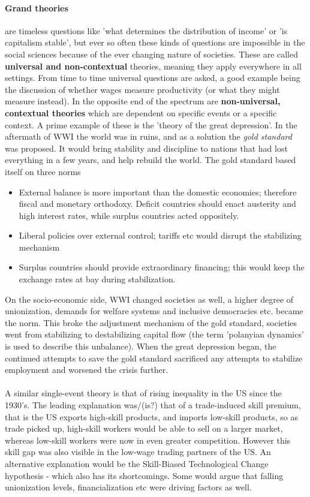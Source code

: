 \documentclass[12pt, a4paper]{article}
\begin{document}
\begin{multicols}{2}
\paragraph{Grand theories} are timeless questions like 'what determines the distribution of income' or 'is capitalism stable', but ever so often these kinds of questions are impossible in the social sciences because of the ever changing nature of societies. These are called \textbf{universal and non-contextual} theories, meaning they apply everywhere in all settings. From time to time universal questions are asked, a good example being the discussion of whether wages measure productivity (or what they might measure instead). In the opposite end of the spectrum are \textbf{non-universal, contextual theories} which are dependent on specific events or a specific context. A prime example of these is the 'theory of the great depression'. In the aftermath of WWI the world was in ruins, and as a solution the \textit{gold standard} was proposed. It would bring stability and discipline to nations that had lost everything in a few years, and help rebuild the world. The gold standard based itself on three norms
\begin{itemize}
\item[1)] External balance is more important than the domestic economies; therefore fiscal and monetary orthodoxy. Deficit countries should enact austerity and high interest rates, while surplus countries acted oppositely.
\item[2)] Liberal policies over external control; tariffs etc would disrupt the stabilizing mechanism
\item[3)] Surplus countries should provide extraordinary financing; this would keep the exchange rates at bay during stabilization.
\end{itemize}
On the socio-economic side, WWI changed societies as well, a higher degree of unionization, demands for welfare systems and inclusive democracies etc. became the norm. This broke the adjustment mechanism of the gold standard, societies went from stabilizing to destabilizing capital flow (the term 'polanyian dynamics' is used to describe this unbalance). When the great depression began, the continued attempts to save the gold standard sacrificed any attempts to stabilize employment and worsened the crisis further. 
\\ \\
A similar single-event theory is that of rising inequality in the US since the 1930's. The leading explanation was/(is?) that of a trade-induced skill premium, that is the US exports high-skill products, and imports low-skill products, so as trade picked up, high-skill workers would be able to sell on a larger market, whereas low-skill workers were now in even greater competition. However this skill gap was also visible in the low-wage trading partners of the US. An alternative explanation would be the Skill-Biased Technological Change hypothesis - which also has its shortcomings. Some would argue that falling unionization levels, financialization etc were driving factors as well. 

\end{multicols}
\end{document}
